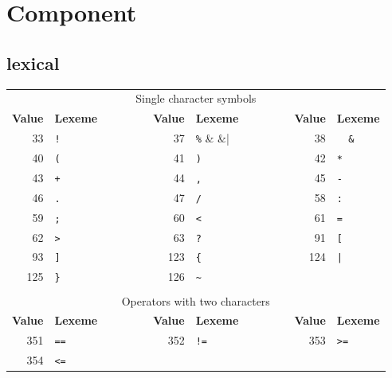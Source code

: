 \documentclass{report}
\newcommand{\+}{}
\begin{document}
    \section{Component}\label{sec:component}

    \subsection{lexical}\label{subsec:lexical}
    \begin{table}[t]
        \centering
        \begin{tabular}{rlcrlcrl}
            \multicolumn{8}{c}{Single character symbols}
            \\[1mm]
            {\bf Value} & {\bf Lexeme}
            & ~~~~~~ &
                {\bf Value} & {\bf Lexeme}
            & ~~~~~~ &
                {\bf Value} & {\bf Lexeme}
            \\ \cline{1-2} \cline{4-5} \cline{7-8}
            33 & \verb|!| & &
            37 & \verb|%| & &
            38 & \verb|  &  | \\
            40 & \verb|(| & &
            41 & \verb|)| & &
            42 & \verb|*| \\
            43 & \verb|+| & &
            44 & \verb|,| & &
            45 & \verb|-| \\
            46 & \verb|.| & &
            47 & \verb|/| & &
            58 & \verb|:| \\
            59 & \verb|;| & &
            60 & \verb|<| & &
            61 & \verb|=| \\
            62 & \verb|>| & &
            63 & \verb|?| & &
            91 & \verb|[| \\
            93 & \verb|]| & &
            123 & \verb|{| & &
            124 & \verb+|+ \\
            125 & \verb|}| & &
            126 & \verb|~| \\
            \\
            \multicolumn{8}{c}{Operators with two characters}
            \\[1mm]
            {\bf Value} & {\bf Lexeme}
            & ~~~~~~ &
                {\bf Value} & {\bf Lexeme}
            & ~~~~~~ &
                {\bf Value} & {\bf Lexeme}
            \\ \cline{1-2} \cline{4-5} \cline{7-8}
            351 & \verb|==| & &
            352 & \verb|!=| & &
            353 & \verb|>=| \\
            354 & \verb|<=| & &

\end{tabular}
\end{table}
\end{document}
